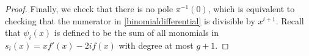 \documentclass[draft, 11pt]{article} %
\theoremstyle{plain}
\theoremstyle{remark}
\begin{document}
\begin{proof}
Finally, we check that there is no pole $\pi^{-1}(0)$, which is equivalent to checking that the numerator in \eqref{binomialdifferential} is divisible by $x^{i+1}$.
Recall that $\psi_i(x)$ is defined to be the sum of all monomials in $s_i(x) = xf'(x) - 2if(x)$ with degree at most $g+1$.
\end{proof}
































\end{document}
